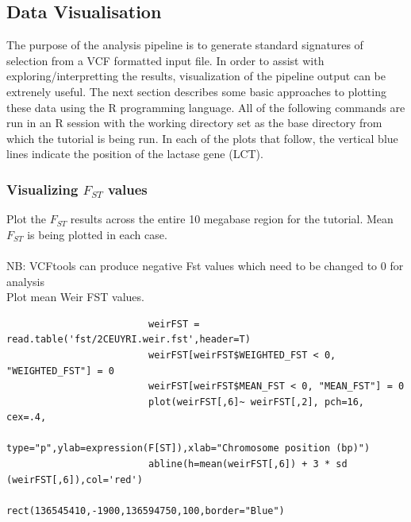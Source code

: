 \documentclass[a4paper,10pt]{article}
\begin{document}
                         \subsection{Data Visualisation}
                         The purpose of the analysis pipeline is to generate standard signatures of
                         selection from a VCF formatted input file. In order to assist with
                         exploring/interpretting the results, visualization of the pipeline
                         output can be extrenely useful.
                         The next section describes some basic approaches to 
                         plotting these data using the R programming language. All of the following
                         commands are run in an R session with the working directory set as the base
                         directory from which the tutorial is being run. In each of the plots
                         that follow, the vertical blue lines indicate the position of the
                         lactase gene (LCT). 
                         \subsubsection{Visualizing $F_{ST}$ values}

                         \noindent
                         Plot the $F_{ST}$ results across the entire 10 megabase region for the tutorial.  Mean $F_{ST}$ is being plotted in each case.\\
                         \\
                         NB: VCFtools can produce negative Fst values which need to be changed to 0 for analysis\\
                         \noindent
                         Plot mean Weir FST values.\\
                         \begin{verbatim}
                         weirFST = read.table('fst/2CEUYRI.weir.fst',header=T) 
                         weirFST[weirFST$WEIGHTED_FST < 0, "WEIGHTED_FST"] = 0
                         weirFST[weirFST$MEAN_FST < 0, "MEAN_FST"] = 0
                         plot(weirFST[,6]~ weirFST[,2], pch=16, cex=.4, 
                         type="p",ylab=expression(F[ST]),xlab="Chromosome position (bp)") 
                         abline(h=mean(weirFST[,6]) + 3 * sd (weirFST[,6]),col='red')
                         rect(136545410,-1900,136594750,100,border="Blue") 
                         \end{verbatim}
\end{document}
